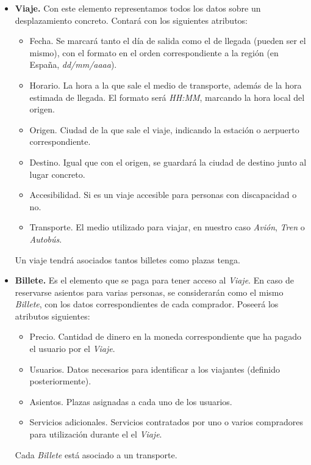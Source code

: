 \begin{itemize}
    \item \textbf{Viaje.} Con este elemento representamos todos los datos sobre un desplazamiento
        concreto. Contará con los siguientes atributos:
        \begin{itemize}
            \item Fecha. Se marcará tanto el día de salida como el de llegada (pueden ser el mismo),
                con el formato en el orden correspondiente a la región (en España, \textit{dd/mm/aaaa}).
            \item Horario. La hora a la que sale el medio de transporte, además de la hora estimada de 
                llegada. El formato será \textit{HH:MM}, marcando la hora local del origen.
            \item Origen. Ciudad de la que sale el viaje, indicando la estación o aerpuerto correspondiente.
            \item Destino. Igual que con el origen, se guardará la ciudad de destino junto al lugar concreto.
            \item Accesibilidad. Si es un viaje accesible para personas con discapacidad o no.
            \item Transporte. El medio utilizado para viajar, en nuestro caso \textit{Avión}, \textit{Tren} o
                \textit{Autobús}.
        \end{itemize}

        Un viaje tendrá asociados tantos billetes como plazas tenga.

    \item \textbf{Billete.} Es el elemento que se paga para tener acceso al \textit{Viaje}. En caso de reservarse asientos
        para varias personas, se considerarán como el mismo \textit{Billete}, con los datos correspondientes de cada comprador.
        Poseerá los atributos siguientes:
        \begin{itemize}
            \item Precio. Cantidad de dinero en la moneda correspondiente que ha pagado el usuario por el \textit{Viaje}.
            \item Usuarios. Datos necesarios para identificar a los viajantes (definido posteriormente).
            \item Asientos. Plazas asignadas a cada uno de los usuarios.
            \item Servicios adicionales. Servicios contratados por uno o varios compradores para utilización durante el
                el \textit{Viaje}.
        \end{itemize}
        Cada \textit{Billete} está asociado a un transporte.


\end{itemize}
